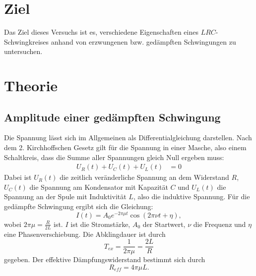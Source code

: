 \section{Ziel}
Das Ziel dieses Versuchs ist es, verschiedene Eigenschaften eines $LRC$-Schwingkreises
anhand von erzwungenen bzw. gedämpften Schwingungen zu untersuchen.

\section{Theorie}
\label{sec:Theorie}
\cite{V354}

\subsection{Amplitude einer gedämpften Schwingung}
Die Spannung lässt sich im Allgemeinen als Differentialgleichung darstellen.
Nach dem 2. Kirchhoffschen Gesetz gilt für die Spannung in einer Masche,
also einem Schaltkreis, dass die Summe aller Spannungen gleich Null ergeben muss:
\begin{align*}
    U_{R}(t)+U_{C}(t)+U_{L}(t) &= 0 
\end{align*}
Dabei ist $U_{R}(t)$ die zeitlich veränderliche Spannung an dem Widerstand $R$,
$U_{C}(t)$ die Spannung am Kondensator mit Kapazität $C$ und $U_{L}(t)$ die Spannung
an der Spule mit Induktivität $L$, also die induktive Spannung.
Für die gedämpfte Schwingung ergibt sich die Gleichung:
\begin{equation}
    I(t)= A_{0} e^{-2 \pi \mu t} \cos(2 \pi \nu t + \eta),
\end{equation}
wobei $2 \pi \mu = \frac{R}{2L}$ ist. $I$ ist die Stromstärke, $A_{0}$ der Startwert,
$\nu$ die Frequenz und $\eta$ eine Phasenverschiebung.
Die Abklingdauer ist durch
\begin{equation}
    T_{ex} = \frac{1}{2 \pi \mu} = \frac{2L}{R}
    \label{eqn:t_ex}
\end{equation}
gegeben.
Der effektive Dämpfungswiderstand bestimmt sich durch
\begin{equation}
    R_{eff} = 4 \pi \mu L.
    \label{eqn:reff}
\end{equation}

